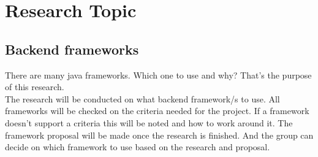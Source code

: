 \section{Research Topic}
\label{sec:research}

\subsection{Backend frameworks}

There are many java frameworks. Which one to use and why? That's the purpose of this research. \\

The research will be conducted on what backend framework/s to use. All frameworks will be checked on the criteria needed for the project. If a framework doesn't support a criteria this will be noted and how to work around it. The framework proposal will be made once the research is finished. And the group can decide on which framework to use based on the research and proposal.